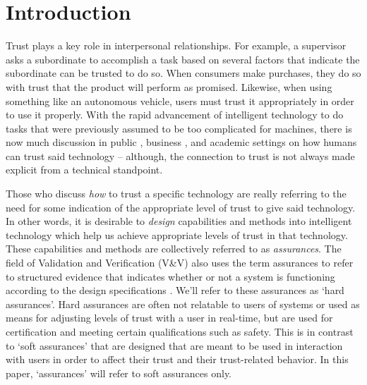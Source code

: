\section{Introduction}
    Trust plays a key role in interpersonal relationships. 
    For example, a supervisor asks a subordinate to accomplish a task based on several factors that indicate the subordinate can be trusted to do so. When consumers make purchases, they do so with trust that the product will perform as promised. Likewise, when using something like an autonomous vehicle, users must trust it appropriately in order to use it properly. 
With the rapid advancement of intelligent technology to do tasks that were previously assumed to be too complicated for machines, there is now much discussion in public \cite{Spectrum2016-jv,DeSteno2014-cq,Cranz2017-yh,Cassel2017-tn,Danks2017-sb,Wagner2016-ck}, business \cite{Banavar2016-nm, Khosravi2016-ke,Moody2017-vd,Rudnitsky2017-in,Benioff2016-tc,Tankard2016-rk}, and academic settings \cite{Groom2007-bz,Lloyd2014-bb,Goodrum_2016-fm,Foley2017-qj,Ghahramani2015-yq,Castelvecchi2016-mr} on how humans can trust said technology -- although, the connection to trust is not always made explicit from a technical standpoint. 

    Those who discuss \emph{how} to trust a specific technology are really referring to the need for some indication of the appropriate level of trust to give said technology. In other words, it is desirable to \emph{design} capabilities and methods into intelligent technology which help us achieve appropriate levels of trust in that technology. These capabilities and methods are collectively referred to as \textit{assurances}. The field of Validation and Verification (V\&V) also uses the term assurances to refer to structured evidence that indicates whether or not a system is functioning according to the design specifications \cite{Calinescu2017-fh}. We'll refer to these assurances as `hard assurances'. Hard assurances are often not relatable to users of systems or used as means for adjusting levels of trust with a user in real-time, but are used for certification and meeting certain qualifications such as safety. This is in contrast to `soft assurances' that are designed that are meant to be used in interaction with users in order to affect their trust and their trust-related behavior. In this paper, `assurances' will refer to soft assurances only.
    
